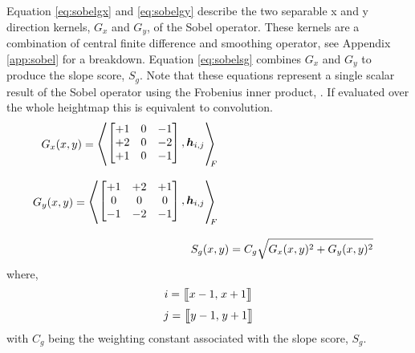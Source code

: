         Equation \ref{eq:sobelgx} and \ref{eq:sobelgy} describe the two separable x and y direction kernels, \(G_x\) and \(G_y\),
        of the Sobel operator. These kernels are a combination of central finite difference and smoothing operator, see Appendix \ref{app:sobel} 
        for a breakdown. Equation \ref{eq:sobelsg} combines \(G_x\) and \(G_y\) to produce the slope score, \(S_g\). Note that these equations represent
        a single scalar result of the Sobel operator using the Frobenius inner product, \cite{horn2012matrix}. If evaluated over the whole heightmap this is equivalent
        to convolution.
        \begin{align}
            \begin{split} \label{eq:sobelgx}
                G_x(x,y) &= 
                        \sbox0{$
                        \begin{bmatrix}
                            +1 & 0 & -1\\
                            +2 & 0 & -2\\
                            +1 & 0 & -1
                        \end{bmatrix}
                        ,\boldsymbol{h}_{i,j}
                        $}
                        \mathopen{\resizebox{1.2\width}{1.1\ht0}{$\Bigg\langle$}}
                        \raisebox{0.08\ht0}{\usebox{0}}
                        \mathclose{\resizebox{1.2\width}{1.1\ht0}{$\Bigg\rangle$}}_{\mkern-10mu F}
            \end{split}\\[0.3cm]
            \begin{split} \label{eq:sobelgy}
                G_y(x,y) &= 
                        \sbox0{$
                        \begin{bmatrix}
                            +1 & +2 & +1\\
                            0 & 0 & 0\\
                            -1 & -2 & -1
                        \end{bmatrix}
                        ,\boldsymbol{h}_{i,j}
                        $}
                        \mathopen{\resizebox{1.2\width}{1.1\ht0}{$\Bigg\langle$}}
                        \raisebox{0.08\ht0}{\usebox{0}}
                        \mathclose{\resizebox{1.2\width}{1.1\ht0}{$\Bigg\rangle$}}_{\mkern-10mu F}
            \end{split}\\[0.3cm]
            S_g(x,y) &= C_g\sqrt{G_x(x,y)^2 + G_y(x,y)^2} \label{eq:sobelsg}
        \end{align}
        where,
        \[i = \big[\mkern-4.7mu\big[x-1,\mkern2mu x+1\big]\mkern-4.7mu\big]\]
        \[j = \big[\mkern-4.7mu\big[y-1,\mkern2mu y+1\big]\mkern-4.7mu\big]\]
        \noindent
        with \(C_g\) being the weighting constant associated with the slope score, \(S_g\).
        
